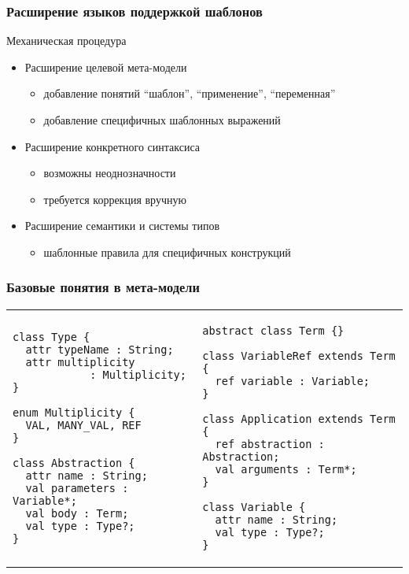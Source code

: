 \documentclass{beamer}
\begin{document}
\begin{frame}[fragile]
	\frametitle{Расширение языков поддержкой шаблонов}
\begin{block}{Механическая процедура}
\begin{itemize}
\item Расширение целевой мета-модели
	\begin{itemize}
		\item добавление понятий ``шаблон'', ``применение'', ``переменная''
		\item добавление специфичных шаблонных выражений
	\end{itemize}
\item Расширение конкретного синтаксиса
	\begin{itemize}
		\item возможны неоднозначности
		\item требуется коррекция вручную
	\end{itemize}
\item Расширение семантики и системы типов
	\begin{itemize}
		\item шаблонные правила для специфичных конструкций
	\end{itemize}
\end{itemize}	
\end{block}
\end{frame}

\begin{frame}[fragile]
	\frametitle{Базовые понятия в мета-модели}
{
\begin{tabular}{p{}p{}}
\begin{lstlisting}[xleftmargin=-.8cm]
class Type {
  attr typeName : String;
  attr multiplicity 
  			: Multiplicity;
}

enum Multiplicity {
  VAL, MANY_VAL, REF
}

class Abstraction {
  attr name : String;
  val parameters : Variable*;
  val body : Term;
  val type : Type?;
}

\end{lstlisting}
&
\begin{lstlisting}[xleftmargin=-.1cm]
abstract class Term {}

class VariableRef extends Term {
  ref variable : Variable;
}

class Application extends Term {
  ref abstraction : Abstraction;
  val arguments : Term*;
}

class Variable {
  attr name : String;
  val type : Type?;
}
\end{lstlisting}
\end{tabular}
}
\end{frame}
\end{document}
